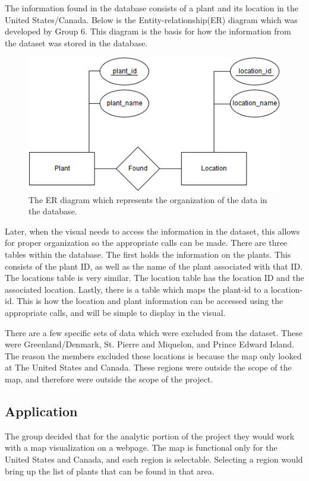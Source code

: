 \documentclass{Group6_Phase2}
\begin{document}
 The information found in the database consists of a plant and its location in the United States/Canada. Below is the Entity-relationship(ER) diagram which was developed by Group 6. This diagram is the basis for how the information from the dataset was stored in the database.

\begin{figure}[htb]
	\centering
	\includegraphics[scale=0.5]{FinalProject_ERdiagram.png}
	\caption{The ER diagram which represents the organization of the data in the database.}
\end{figure}

Later, when the visual needs to access the information in the dataset, this allows for proper organization so the appropriate calls can be made. There are three tables within the database. The first holds the information on the plants. This consists of the plant ID, as well as the name of the plant associated with that ID. The locations table is very similar. The location table has the location ID and the associated location. Lastly, there is a table which maps the plant-id to a location-id. This is how the location and plant information can be accessed using the appropriate calls, and will be simple to display in the visual.

There are a few specific sets of data which were excluded from the dataset. These were Greenland/Denmark, St. Pierre and Miquelon, and Prince Edward Island. The reason the members excluded these locations is because the map only looked at The United States and Canada. These regions were outside the scope of the map, and therefore were outside the scope of the project. 


\subsection{Application}
The group decided that for the analytic portion of the project they would work with a map visualization on a webpage. The map is functional only for the United States and Canada, and each region is selectable. Selecting a region would bring up the list of plants that can be found in that area. 
\end{document}
